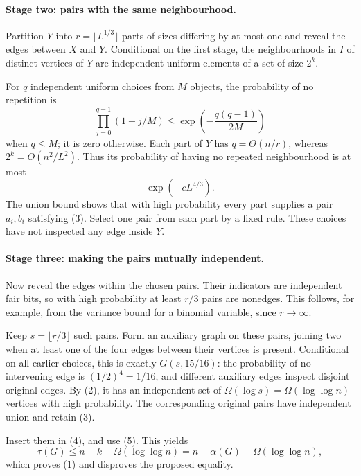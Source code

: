 \paragraph{Stage two: pairs with the same neighbourhood.}
Partition \(Y\) into \(r=\lfloor L^{1/3}\rfloor\) parts of sizes differing by at most one and reveal the edges between \(X\) and \(Y\). Conditional on the first stage, the neighbourhoods in \(I\) of distinct vertices of \(Y\) are independent uniform elements of a set of size \(2^k\).

For \(q\) independent uniform choices from \(M\) objects, the probability of no repetition is
\[
 \prod_{j=0}^{q-1}(1-j/M)
 \leq\exp\!\left(-\frac{q(q-1)}{2M}\right)
\]
when \(q\leq M\); it is zero otherwise. Each part of \(Y\) has \(q=\Theta(n/r)\), whereas \(2^k=O(n^2/L^2)\). Thus its probability of having no repeated neighbourhood is at most
\[
 \exp(-cL^{4/3}).
\]
The union bound shows that with high probability every part supplies a pair \(a_i,b_i\) satisfying (3). Select one pair from each part by a fixed rule. These choices have not inspected any edge inside \(Y\).

\paragraph{Stage three: making the pairs mutually independent.}
Now reveal the edges within the chosen pairs. Their indicators are independent fair bits, so with high probability at least \(r/3\) pairs are nonedges. This follows, for example, from the variance bound for a binomial variable, since \(r\to\infty\).

Keep \(s=\lfloor r/3\rfloor\) such pairs. Form an auxiliary graph on these pairs, joining two when at least one of the four edges between their vertices is present. Conditional on all earlier choices, this is exactly \(G(s,15/16)\): the probability of no intervening edge is \((1/2)^4=1/16\), and different auxiliary edges inspect disjoint original edges. By (2), it has an independent set of \(\Omega(\log s)=\Omega(\log\log n)\) vertices with high probability. The corresponding original pairs have independent union and retain (3).

Insert them in (4), and use (5). This yields
\[
 \tau(G)\leq n-k-\Omega(\log\log n)
 =n-\alpha(G)-\Omega(\log\log n),
\]
which proves (1) and disproves the proposed equality.

